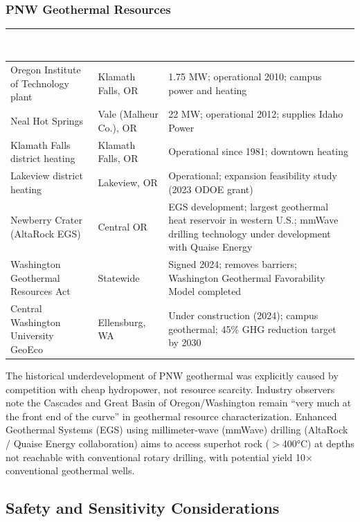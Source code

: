 \documentclass[11pt,letterpaper]{article}
\newcommand{\tableheader}[1]{\textbf{\sffamily\textcolor{white}{#1}}}
\begin{document}
\subsubsection{PNW Geothermal Resources}

\begin{center}
\begin{tabularx}{\textwidth}{L{4cm}L{3cm}X}
\toprule
{}
\tableheader{Facility / Project} & \tableheader{Location} & \tableheader{Status and Capacity} \\
\midrule
Oregon Institute of Technology plant & Klamath Falls, OR & 1.75 MW; operational 2010; campus power and heating \\
Neal Hot Springs & Vale (Malheur Co.), OR & 22 MW; operational 2012; supplies Idaho Power \\
Klamath Falls district heating & Klamath Falls, OR & Operational since 1981; downtown heating \\
Lakeview district heating & Lakeview, OR & Operational; expansion feasibility study (2023 ODOE grant) \\
Newberry Crater (AltaRock EGS) & Central OR & EGS development; largest geothermal heat reservoir in western U.S.; mmWave drilling technology under development with Quaise Energy \\
Washington Geothermal Resources Act & Statewide & Signed 2024; removes barriers; Washington Geothermal Favorability Model completed \\
Central Washington University GeoEco & Ellensburg, WA & Under construction (2024); campus geothermal; 45\% GHG reduction target by 2030 \\
\bottomrule
\end{tabularx}
\end{center}

The historical underdevelopment of PNW geothermal was explicitly caused by competition with cheap hydropower, not resource scarcity. Industry observers note the Cascades and Great Basin of Oregon/Washington remain ``very much at the front end of the curve'' in geothermal resource characterization. Enhanced Geothermal Systems (EGS) using millimeter-wave (mmWave) drilling (AltaRock / Quaise Energy collaboration) aims to access superhot rock ($>$400°C) at depths not reachable with conventional rotary drilling, with potential yield 10× conventional geothermal wells.

\subsection{Safety and Sensitivity Considerations}
\end{document}
